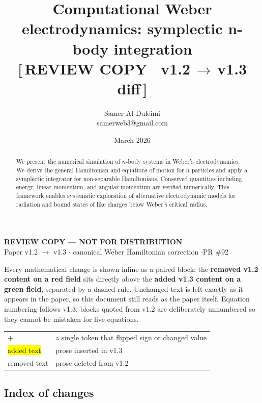 \documentclass[12pt,a4paper]{article}
\title{Computational Weber electrodynamics: symplectic n-body integration\\[4pt]{\large\sffamily\bfseries\color{oldink}[\,REVIEW COPY \textemdash\ v1.2\,$\rightarrow$\,v1.3 diff\,]}}
\author{Samer Al Duleimi \\
\small samerweb3@gmail.com}
\date{March 2026}
\theoremstyle{definition}
\theoremstyle{remark}
\newcommand{\dins}[1]{\hl{#1}}
\newcommand{\ddel}[1]{{\color{oldink}\st{#1}}}
\begin{document}
\maketitle

\begin{abstract}
    We present the numerical simulation of $n$-body systems in Weber's electrodynamics. We derive the general Hamiltonian and equations of motion for $n$ particles and apply a symplectic integrator for non-separable Hamiltonians. Conserved quantities including energy, linear momentum, and angular momentum are verified numerically. This framework enables systematic exploration of alternative electrodynamic models for radiation and bound states of like charges below Weber's critical radius.
\end{abstract}

\begin{center}
\begin{tcolorbox}[enhanced, width=\textwidth, colback=barink!6, colframe=barink,
  boxrule=1pt, arc=3pt, left=12pt, right=12pt, top=10pt, bottom=10pt]
\begin{center}
{\sffamily\bfseries\large REVIEW COPY — NOT FOR DISTRIBUTION}\\[3pt]
{\sffamily\small Paper v1.2 $\rightarrow$ v1.3 \quad$\cdot$\quad
canonical Weber Hamiltonian correction \quad$\cdot$\quad PR \#92}
\end{center}
\smallskip
\small
Every mathematical change is shown inline as a paired block: the
\textcolor{oldink}{\textbf{removed v1.2 content on a red field}} sits directly above the
\textcolor{newink}{\textbf{added v1.3 content on a green field}}, separated by a dashed rule.
Unchanged text is left exactly as it appears in the paper, so this document still reads
as the paper itself. Equation numbering follows v1.3; blocks quoted from v1.2 are
deliberately unnumbered so they cannot be mistaken for live equations.

\smallskip
\noindent
\begin{tabular}{@{}ll@{}}
\colorbox{sigbg}{$+$} & a single token that flipped sign or changed value \\
\dins{added text} & prose inserted in v1.3 \\
\ddel{removed text} & prose deleted from v1.2 \\
\end{tabular}
\end{tcolorbox}
\end{center}

\subsection*{Index of changes}
\end{document}

